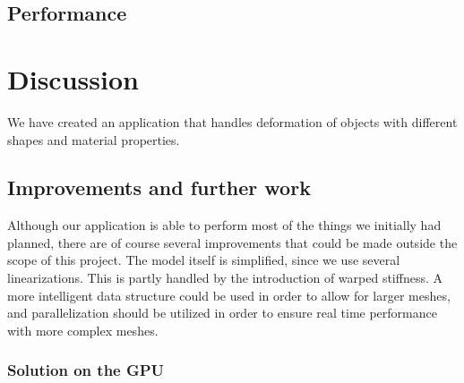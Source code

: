 \documentclass[10pt,a4paper]{article}
\begin{document}
\subsection{Performance}

\section{Discussion}
We have created an application that handles deformation of objects with different shapes and material properties. 
\subsection{Improvements and further work}
Although our application is able to perform most of the things we initially had planned, there are of course several improvements that could be made outside the scope of this project. The model itself is simplified, since we use several linearizations. This is partly handled by the introduction of warped stiffness. A more intelligent data structure could be used in order to allow for larger meshes, and parallelization should be utilized in order to ensure real time performance with more complex meshes. 
\subsubsection{Solution on the GPU}





\pagebreak
{}


\end{document}
